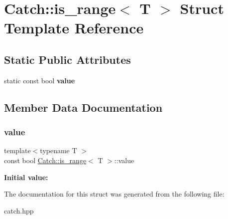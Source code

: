 \hypertarget{structCatch_1_1is__range}{}\section{Catch\+::is\+\_\+range$<$ T $>$ Struct Template Reference}
\label{structCatch_1_1is__range}
\subsection*{Static Public Attributes}
\begin{DoxyCompactItemize}
\item 
static const bool {\bfseries value}
\end{DoxyCompactItemize}


\subsection{Member Data Documentation}
\mbox{\label{structCatch_1_1is__range_afaec39e819c3956829cbbd00feba11be}} 
\subsubsection{\texorpdfstring{value}{value}}
{\footnotesize\ttfamily template$<$typename T $>$ \\
const bool \mbox{\hyperlink{structCatch_1_1is__range}{Catch\+::is\+\_\+range}}$<$ T $>$\+::value\hspace{0.3cm}{\ttfamily [static]}}

{\bfseries Initial value\+:}
\begin{DoxyCode}{0}
\DoxyCodeLine{=}

\end{DoxyCode}


The documentation for this struct was generated from the following file\+:\begin{DoxyCompactItemize}
\item 
catch.\+hpp\end{DoxyCompactItemize}
